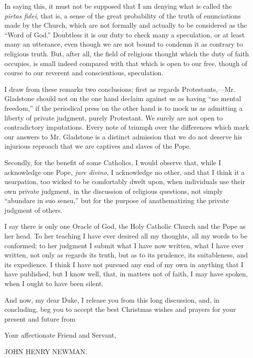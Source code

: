 In saying this, it must not be supposed that I am denying what is
called the \emph{pietas fidei}, that is, a sense of the great
probability of the truth of enunciations made by the Church, which are
not formally and actually to be considered as the ``Word of
God.'' Doubtless it is our duty to check many a speculation,
or at least many an utterance, even though we are not bound to condemn
it as contrary to religious truth. But, after all, the field of
religious thought which the duty of faith occupies, is small indeed
compared with that which is open to our free, though of course to our
reverent and conscientious, speculation.

I draw from these remarks two conclusions; first as regards
Protestants,—Mr. Gladstone should not on the one hand declaim against
us as having ``no mental freedom,'' if the periodical press on
the other hand is to mock us as admitting a liberty of private judgment,
purely Protestant. We surely are not open to contradictory imputations.
Every note of triumph over the differences which mark our answers to Mr.
Gladstone is a distinct admission that we do not deserve his injurious
reproach that we are captives and slaves of the Pope.

Secondly, for the benefit of some Catholics, I would observe that,
while I acknowledge one Pope, \emph{jure divino}, I acknowledge no
other, and that I think it a usurpation, too wicked to be comfortably
dwelt upon, when individuals use their own private judgment, in the
discussion of religious questions, not simply ``abundare in suo
sensu,'' but for the purpose of anathematizing the private judgment
of others.

I say there is only one Oracle of God, the Holy Catholic Church and
the Pope as her head. To her teaching I have ever desired all my
thoughts, all my words to be conformed; to her judgment I submit what I
have now written, what I have ever written, not only as regards
its truth, but as to its prudence, its suitableness, and its expedience.
I think I have not pursued any end of my own in anything that I have
published, but I know well, that, in matters not of faith, I may have
spoken, when I ought to have been silent.

And now, my dear Duke, I release you from this long discussion, and,
in concluding, beg you to accept the best Christmas wishes and prayers
for your present and future from

Your affectionate Friend and Servant,

JOHN HENRY NEWMAN.

